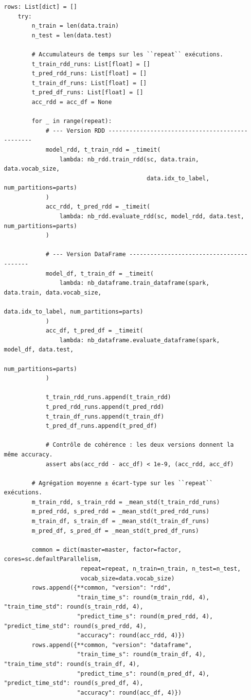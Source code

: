\begin{lstlisting}[style=py]
    rows: List[dict] = []
    try:
        n_train = len(data.train)
        n_test = len(data.test)

        # Accumulateurs de temps sur les ``repeat`` exécutions.
        t_train_rdd_runs: List[float] = []
        t_pred_rdd_runs: List[float] = []
        t_train_df_runs: List[float] = []
        t_pred_df_runs: List[float] = []
        acc_rdd = acc_df = None

        for _ in range(repeat):
            # --- Version RDD ------------------------------------------------
            model_rdd, t_train_rdd = _timeit(
                lambda: nb_rdd.train_rdd(sc, data.train, data.vocab_size,
                                         data.idx_to_label, num_partitions=parts)
            )
            acc_rdd, t_pred_rdd = _timeit(
                lambda: nb_rdd.evaluate_rdd(sc, model_rdd, data.test, num_partitions=parts)
            )

            # --- Version DataFrame -----------------------------------------
            model_df, t_train_df = _timeit(
                lambda: nb_dataframe.train_dataframe(spark, data.train, data.vocab_size,
                                                     data.idx_to_label, num_partitions=parts)
            )
            acc_df, t_pred_df = _timeit(
                lambda: nb_dataframe.evaluate_dataframe(spark, model_df, data.test,
                                                        num_partitions=parts)
            )

            t_train_rdd_runs.append(t_train_rdd)
            t_pred_rdd_runs.append(t_pred_rdd)
            t_train_df_runs.append(t_train_df)
            t_pred_df_runs.append(t_pred_df)

            # Contrôle de cohérence : les deux versions donnent la même accuracy.
            assert abs(acc_rdd - acc_df) < 1e-9, (acc_rdd, acc_df)

        # Agrégation moyenne ± écart-type sur les ``repeat`` exécutions.
        m_train_rdd, s_train_rdd = _mean_std(t_train_rdd_runs)
        m_pred_rdd, s_pred_rdd = _mean_std(t_pred_rdd_runs)
        m_train_df, s_train_df = _mean_std(t_train_df_runs)
        m_pred_df, s_pred_df = _mean_std(t_pred_df_runs)

        common = dict(master=master, factor=factor, cores=sc.defaultParallelism,
                      repeat=repeat, n_train=n_train, n_test=n_test,
                      vocab_size=data.vocab_size)
        rows.append({**common, "version": "rdd",
                     "train_time_s": round(m_train_rdd, 4), "train_time_std": round(s_train_rdd, 4),
                     "predict_time_s": round(m_pred_rdd, 4), "predict_time_std": round(s_pred_rdd, 4),
                     "accuracy": round(acc_rdd, 4)})
        rows.append({**common, "version": "dataframe",
                     "train_time_s": round(m_train_df, 4), "train_time_std": round(s_train_df, 4),
                     "predict_time_s": round(m_pred_df, 4), "predict_time_std": round(s_pred_df, 4),
                     "accuracy": round(acc_df, 4)})


\end{lstlisting}

